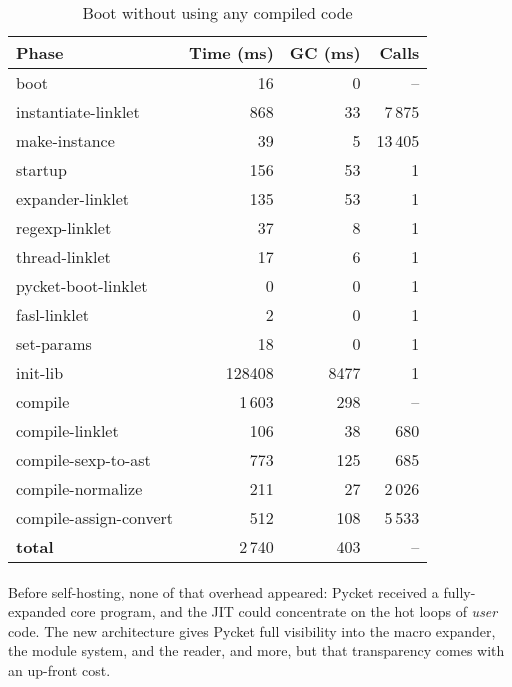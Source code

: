 		\begin{table}[ht]
		\centering
		\begin{tabular}{@{}lrrr@{}}
			\toprule
			Phase & Time (ms) & GC (ms) & Calls \\ \midrule
			boot                           &     16 &    0 & -- \\
			instantiate-linklet            &    868 &   33 & 7\,875 \\
			make-instance                  &     39 &    5 & 13\,405 \\
			startup                        &    156 &   53 & 1 \\
			\quad expander-linklet         &    135 &   53 & 1 \\
			\quad regexp-linklet                 &     37 &    8 & 1 \\
			\quad thread-linklet                 &     17 &    6 & 1 \\
			\quad pycket-boot-linklet            &      0 &    0 & 1 \\
			\quad fasl-linklet             &      2 &    0 & 1 \\
			\quad set-params               &     18 &    0 & 1 \\
			init-lib					   &	128408 &   8477 & 1 \\ \midrule
			compile                        &  1\,603 &  298 & -- \\
			\quad compile-linklet          &    106 &   38 & 680 \\
			\quad compile-sexp-to-ast      &    773 &  125 & 685 \\
			\quad compile-normalize        &    211 &   27 & 2\,026 \\
			\quad compile-assign-convert   &    512 &  108 & 5\,533 \\ \midrule
			\textbf{total}                 &  2\,740 &  403 & -- \\
			\bottomrule
		\end{tabular}
		\caption{Boot without using any compiled code}
		\label{table:boot-no-compiled}
		\end{table}

		\paragraph{}%
			Before self-hosting, none of that overhead appeared: Pycket received a fully-expanded core program, and the JIT could concentrate on the hot loops of \emph{user} code. The new architecture gives Pycket full visibility into the macro expander, the module system, and the reader, and more, but that transparency comes with an up-front cost.


